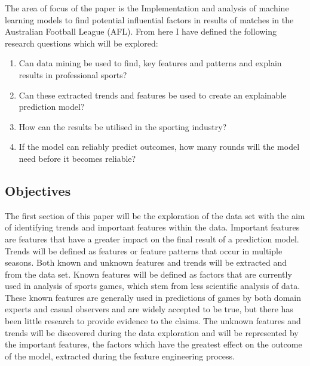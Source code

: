 \documentclass{imc-inf}
\begin{document}
	The area of focus of the paper is the Implementation and analysis of machine learning models to find potential influential factors in results of matches in the Australian Football League (AFL).
	From here I have defined the following research questions which will be explored:
	\begin{enumerate}
		
		\item[] Can data mining be used to find, key features and patterns and explain results in professional sports?
		
		\item[]Can these extracted trends and features be used to create an explainable prediction model?
		
		\item[] How can the results be utilised in the sporting industry?
		
		\item[] If the model can reliably predict outcomes, how many rounds will the model need before it becomes reliable?
	\end{enumerate}
	
	
	\subsection{Objectives}
	The first section of this paper will be the exploration of the data set with the aim of identifying trends and important features within the data. Important features are features that have a greater impact on the final result of a prediction model. Trends will be defined as features or feature patterns that occur in multiple seasons. Both known and unknown features and trends will be extracted and from the data set. Known features will be defined as factors that are currently used in analysis of sports games, which stem from less scientific analysis of data. These known features are generally used in predictions of games by both domain experts and casual observers and are widely accepted to be true, but there has been little research to provide evidence to the claims. The unknown features and trends will be discovered during the data exploration and will be represented by the important features, the factors which have the greatest effect on the outcome of the model, extracted during the feature engineering process.\linebreak
		
\end{document}
